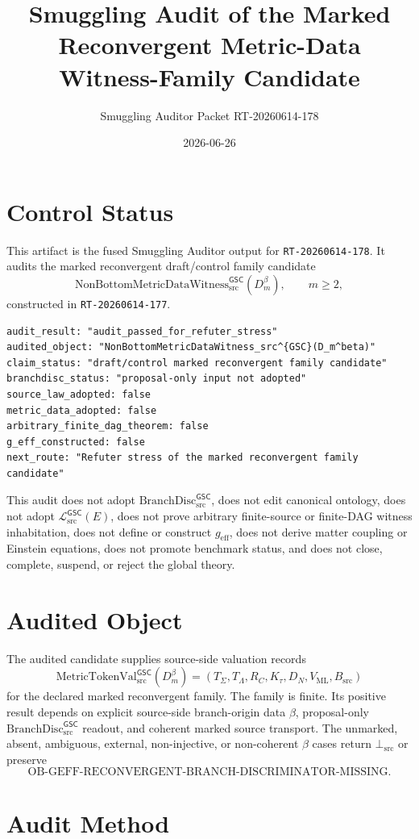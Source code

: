 \documentclass[11pt]{article}
\title{Smuggling Audit of the Marked Reconvergent Metric-Data Witness-Family Candidate}
\author{Smuggling Auditor Packet RT-20260614-178}
\date{2026-06-26}
\newcommand{\Witness}{\mathrm{NonBottomMetricDataWitness}_{\mathrm{src}}^{\mathsf{GSC}}}
\newcommand{\MetricData}{\mathcal{L}_{\mathrm{src}}^{\mathsf{GSC}}}
\newcommand{\MetricTokenVal}{\mathrm{MetricTokenVal}_{\mathrm{src}}^{\mathsf{GSC}}}
\newcommand{\BottomSrc}{\bot_{\mathrm{src}}}
\newcommand{\geff}{g_{\mathrm{eff}}}
\newcommand{\BranchDisc}{\mathrm{BranchDisc}_{\mathrm{src}}^{\mathsf{GSC}}}
\newcommand{\Dmbeta}{D_m^{\beta}}
\begin{document}
\maketitle

\section{Control Status}

This artifact is the fused Smuggling Auditor output for
\texttt{RT-20260614-178}. It audits the marked reconvergent draft/control
family candidate
\[
  \Witness(\Dmbeta),\qquad m\ge 2,
\]
constructed in \texttt{RT-20260614-177}.

\begin{verbatim}
audit_result: "audit_passed_for_refuter_stress"
audited_object: "NonBottomMetricDataWitness_src^{GSC}(D_m^beta)"
claim_status: "draft/control marked reconvergent family candidate"
branchdisc_status: "proposal-only input not adopted"
source_law_adopted: false
metric_data_adopted: false
arbitrary_finite_dag_theorem: false
g_eff_constructed: false
next_route: "Refuter stress of the marked reconvergent family candidate"
\end{verbatim}

This audit does not adopt \(\BranchDisc\), does not edit canonical ontology,
does not adopt \(\MetricData(E)\), does not prove arbitrary finite-source or
finite-DAG witness inhabitation, does not define or construct \(\geff\), does
not derive matter coupling or Einstein equations, does not promote benchmark
status, and does not close, complete, suspend, or reject the global theory.

\section{Audited Object}

The audited candidate supplies source-side valuation records
\[
  \MetricTokenVal(\Dmbeta)=
  (T_{\Sigma},T_{\Lambda},R_C,K_{\tau},D_N,V_{\mathrm{ML}},B_{\mathrm{src}})
\]
for the declared marked reconvergent family. The family is finite. Its
positive result depends on explicit source-side branch-origin data \(\beta\),
proposal-only \(\BranchDisc\) readout, and coherent marked source transport.
The unmarked, absent, ambiguous, external, non-injective, or non-coherent
\(\beta\) cases return \(\BottomSrc\) or preserve
\[
\mathrm{OB\mbox{-}GEFF\mbox{-}RECONVERGENT\mbox{-}BRANCH\mbox{-}DISCRIMINATOR\mbox{-}MISSING}.
\]

\section{Audit Method}
\end{document}
